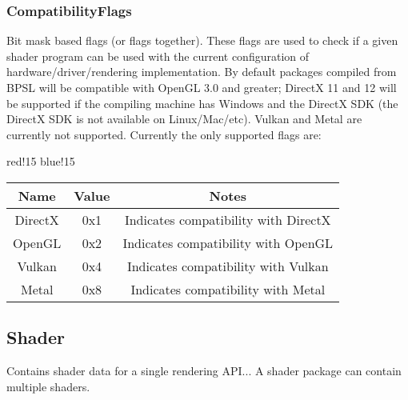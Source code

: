 \subsubsection{CompatibilityFlags}
Bit mask based flags (or flags together). These flags are used to check if a given shader program can be used with the current configuration of hardware/driver/rendering implementation. By default packages compiled from BPSL will be compatible with OpenGL 3.0 and greater; DirectX 11 and 12 will be supported if the compiling machine has Windows and the DirectX SDK (the DirectX SDK is not available on Linux/Mac/etc).\newline
Vulkan and Metal are currently not supported.\newline
Currently the only supported flags are:
\begin{center}
    {
        {red!15}
        {blue!15}
        \begin{tabular}{|c|c|c|}
            \hline
            \textbf{Name} & \textbf{Value} & \textbf{Notes} \\
    
            \hline\hline
            DirectX & 0x1 & Indicates compatibility with DirectX \cite{DirectX} \\
            OpenGL & 0x2 & Indicates compatibility with OpenGL \cite{OpenGL} \\
            Vulkan & 0x4 & Indicates compatibility with Vulkan \cite{Vulkan} \\
            Metal & 0x8 & Indicates compatibility with Metal \cite{Metal} \\
            \hline
        \end{tabular}
    }
\end{center}

\subsection{Shader}
Contains shader data for a single rendering API...\newline
A shader package can contain multiple shaders.

